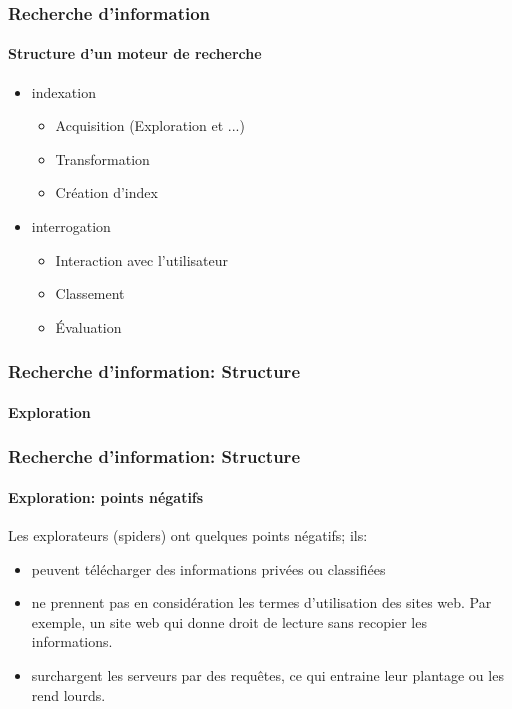\documentclass{beamer}
\begin{document}
\begin{frame}
\frametitle{Recherche d'information}
\framesubtitle{Structure d'un moteur de recherche}

\begin{itemize}
	\item indexation 
	\begin{itemize}
		\item Acquisition (Exploration et ...)
		\item Transformation 
		\item Création d'index
	\end{itemize}
	\item interrogation
	\begin{itemize}
		\item Interaction avec l'utilisateur
		\item Classement 
		\item Évaluation
	\end{itemize}
\end{itemize}

\end{frame}

\begin{frame}
\frametitle{Recherche d'information: Structure}
\framesubtitle{Exploration}

\end{frame}

\begin{frame}
\frametitle{Recherche d'information: Structure}
\framesubtitle{Exploration: points négatifs}

Les explorateurs (spiders) ont quelques points négatifs; ils:
\begin{itemize}
	\item peuvent télécharger des informations privées ou classifiées
	\item ne prennent pas en considération les termes d'utilisation des sites web. 
	Par exemple, un site web qui donne droit de lecture sans recopier les informations. 
	\item surchargent les serveurs par des requêtes, ce qui entraine leur plantage ou les rend lourds.
\end{itemize}

\end{frame}
\end{document}
